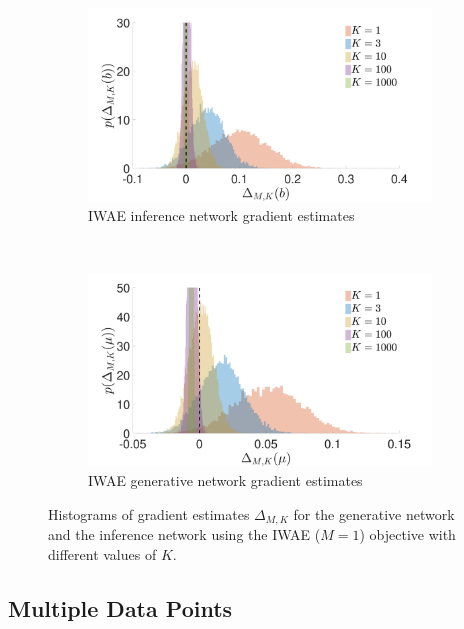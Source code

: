 \begin{figure}[t]
	\centering
	\begin{subfigure}[b]{0.4\textwidth}
		\centering
		\includegraphics[width=\textwidth]{figures/tighter_bounds/b_hist_IWAE} %
		\caption{ \gls{IWAE} inference network gradient estimates \label{fig:snr/b_hist_iwae}}
	\end{subfigure} ~~~~~~~~~~~~~
	\begin{subfigure}[b]{0.4\textwidth}
		\centering
		\includegraphics[width=\textwidth]{figures/tighter_bounds/mu_hist_IWAE} %
		\caption{ \gls{IWAE} generative network gradient estimates \label{fig:snr/mu_hist_iwae}}
	\end{subfigure}\vspace{-6pt}
	\caption{Histograms of gradient estimates $\Delta_{M,K}$ for the generative network and 
		the inference network using the \gls{IWAE} ($M=1$)
		objective with different values of $K$.
			\vspace{-14pt}
		\label{fig:snr/hists}}
\end{figure}

\subsection{Multiple Data Points}
\label{sec:multi}


